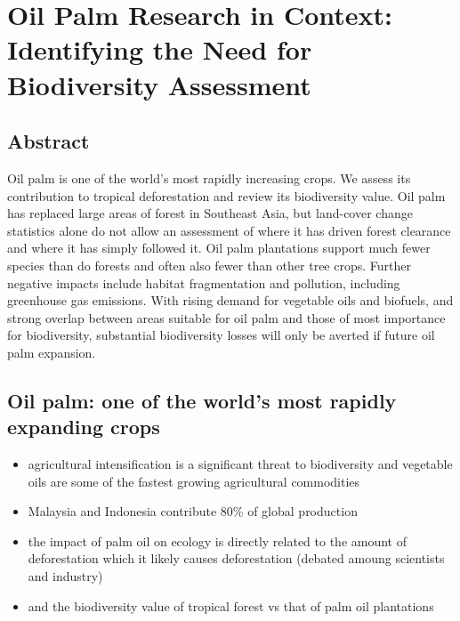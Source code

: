 \section*{Oil Palm Research in Context: Identifying the Need for Biodiversity Assessment \cite{Fitzherbert2008}}

\subsection*{Abstract}
Oil palm is one of the world’s most rapidly increasing crops. We assess its contribution to tropical deforestation and review its biodiversity value. Oil palm has replaced large areas of forest in Southeast Asia, but land-cover change statistics alone do not allow an assessment of where it has driven forest clearance and where it has simply followed it. Oil palm plantations support much fewer species than do forests and often also fewer than other tree crops. Further negative impacts include habitat fragmentation and pollution, including greenhouse gas emissions. With rising demand for vegetable oils and biofuels, and strong overlap between areas suitable for oil palm and those of most importance for biodiversity, substantial biodiversity losses will only be averted if future oil palm expansion.

\subsection*{Oil palm: one of the world's most rapidly expanding crops}
\begin{itemize}
	\item agricultural intensification is a significant threat to biodiversity and vegetable oils are some of the fastest growing agricultural commodities
	\item Malaysia and Indonesia contribute 80\% of global production
	\item the impact of palm oil on ecology is directly related to the amount of deforestation which it likely causes deforestation (debated amoung scientists and industry)
	\item and the biodiversity value of tropical forest vs that of palm oil plantations
\end{itemize}


